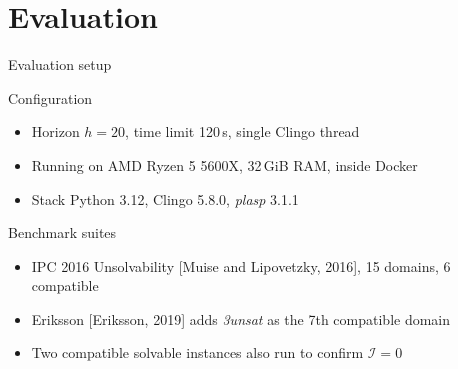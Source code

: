 \section{Evaluation}

\begin{frame}{Evaluation setup}
    \begin{block}{Configuration}
        \begin{itemize}
            \item Horizon $h = 20$, time limit 120\,s, single Clingo thread
            \item Running on AMD Ryzen 5 5600X, 32\,GiB RAM, inside Docker
            \item Stack Python 3.12, Clingo 5.8.0, \textit{plasp} 3.1.1
        \end{itemize}
    \end{block}

    \begin{block}{Benchmark suites}
        \begin{itemize}
            \item IPC 2016 Unsolvability [Muise and Lipovetzky, 2016], 15 domains, 6 compatible
            \item Eriksson [Eriksson, 2019] adds \textit{3unsat} as the 7th compatible domain
            \item Two compatible solvable instances also run to confirm $\mathcal{I} = 0$
        \end{itemize}
    \end{block}

\end{frame}

